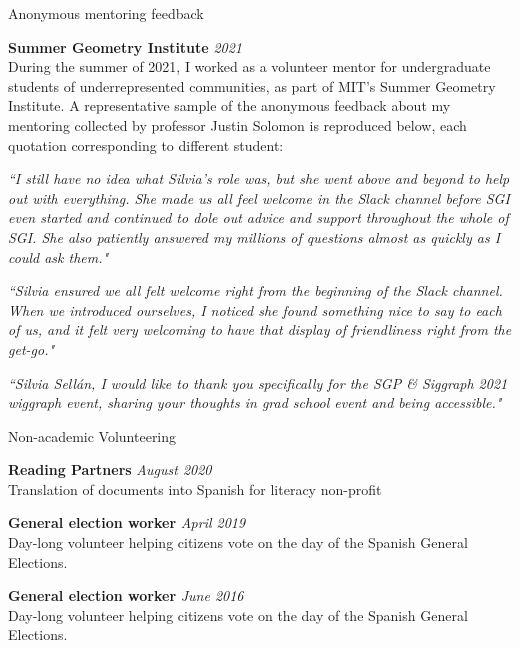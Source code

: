 \documentclass{resume}
\newcommand{\cvitem}[3]{
    {\bf #1} \hfill {\em \small #2} \\ 
    {\small#3 }
}
\newcommand{\feedback}[1]{\it \small #1}
\begin{document}
\begin{rSection}{Anonymous mentoring feedback}

\cvitem{Summer Geometry Institute}{2021}{During the summer of 2021, I worked as a volunteer mentor for undergraduate students of underrepresented communities, as part of MIT's Summer Geometry Institute. A representative sample of the anonymous feedback about my mentoring collected by professor Justin Solomon is reproduced below, each quotation corresponding to different student:}

\feedback{``I still have no idea what Silvia's role was, but she went above and beyond to help out with everything. She made us all feel welcome in the Slack channel before SGI even started and continued to dole out advice and support throughout the whole of SGI. She also patiently answered my millions of questions almost as quickly as I could ask them."}

\feedback{``Silvia ensured we all felt welcome right from the beginning of the Slack channel. When we introduced ourselves, I noticed she found something nice to say to each of us, and it felt very welcoming to have that display of friendliness right from the get-go."}

\feedback{``Silvia Sellán, I would like to thank you specifically for the SGP \& Siggraph 2021 wiggraph event, sharing your thoughts in grad school event and being accessible."}

\end{rSection}

\begin{rSection}{Non-academic Volunteering}

\cvitem{Reading Partners}{August 2020}{Translation of documents into Spanish for literacy non-profit}

\cvitem{General election worker}{April 2019}{Day-long volunteer helping citizens vote on the day of the Spanish General Elections.}

\cvitem{General election worker}{June 2016}{Day-long volunteer helping citizens vote on the day of the Spanish General Elections.}

\end{rSection}
\end{document}
